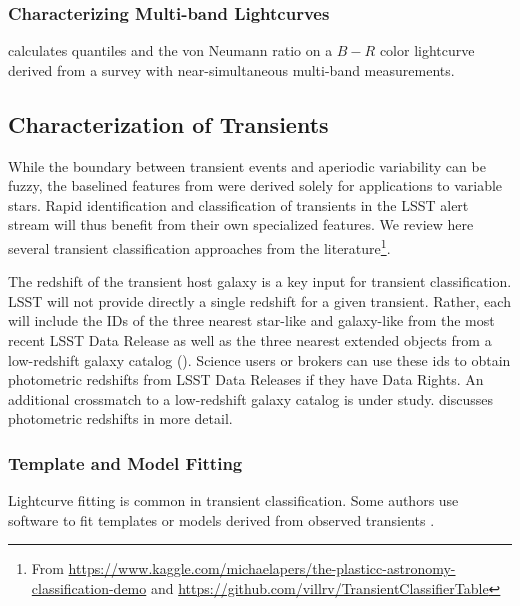 \documentclass[DM,authoryear,toc]{lsstdoc}
\begin{document}
\subsubsection{Characterizing Multi-band Lightcurves}


\citet{Kim:14:The-EPOCH-Proje} calculates quantiles and the von Neumann ratio on a $B-R$ color lightcurve derived from a survey with near-simultaneous multi-band measurements.

\subsection{Characterization of Transients}

While the boundary between transient events and aperiodic variability can be fuzzy, the baselined features from \citet{2011ApJ...733...10R} were derived solely for applications to variable stars.
Rapid identification and classification of transients in the LSST alert stream will thus benefit from their own specialized features.
We review here several transient classification approaches from the literature\footnote{From \url{https://www.kaggle.com/michaelapers/the-plasticc-astronomy-classification-demo} and \url{https://github.com/villrv/TransientClassifierTable}}.

The redshift of the transient host galaxy is a key input for transient classification.
LSST will not provide directly a single redshift for a given transient.
Rather, each \DIAObject will include the IDs of the three nearest star-like and galaxy-like \Objects from the most recent LSST Data Release as well as the three nearest extended objects from a low-redshift galaxy catalog (\DPDD{}). 
Science users or brokers can use these ids to obtain photometric redshifts from LSST Data Releases if they have Data Rights.
An additional crossmatch to a low-redshift galaxy catalog is under study.
 discusses photometric redshifts in more detail.

\subsubsection{Template and Model Fitting}

Lightcurve fitting is common in transient classification.
Some authors use software \citep[e.g.,][]{Jha:07:IaLCFitter,Kessler:09:SNANA,Sako:11:PSNid,Barbary:14:sncosmo,Guillochon:18:MOSFiT}
to fit templates or models derived from observed transients \citep[e.g.,][]{Nugent:02:IaTemplates,Guy:07:SALT2, Conley:08:SiFTO, Kessler:19:PlasticcModels, Vincenzi:19:CCTemplates}.
\end{document}
